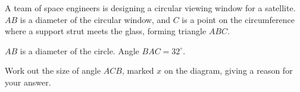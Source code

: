 \begin{question}
\noindent A team of space engineers is designing a circular viewing window for a satellite. $AB$ is a diameter of the circular window, and $C$ is a point on the circumference where a support strut meets the glass, forming triangle $ABC$.

\begin{center}
\end{center}

\noindent $AB$ is a diameter of the circle. Angle $BAC = 32^\circ$.

\noindent Work out the size of angle $ACB$, marked $x$ on the diagram, giving a reason for your answer.

\vspace{4cm}
\end{question}